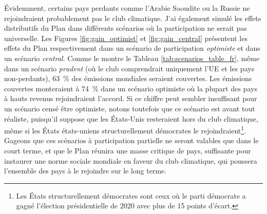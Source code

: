 \documentclass[a5paper,french,openany]{memoir}
\begin{document}
Évidemment, certains pays perdants comme l'Arabie Saoudite ou la Russie ne rejoindraient probablement pas le club climatique. J'ai également simulé les effets distributifs du Plan dans différents scénarios où la participation ne serait pas universelle. Les Figures \ref{fig:gain_optimist} et \ref{fig:gain_central} présentent les effets du Plan respectivement dans un scénario de participation \textit{optimiste} et dans un scénario \textit{central}. Comme le montre le Tableau \ref{tab:scenarios_table_fr}, même dans un scénario \textit{prudent} (où le club comprendrait uniquement l'UE et les pays non-perdants), 63~\% des émissions mondiales seraient couvertes. Les émissions couvertes monteraient à 74~\% dans un scénario optimiste où la plupart des pays à hauts revenus rejoindraient l'accord. Si ce chiffre peut sembler insuffisant pour un scénario censé être optimiste, notons toutefois que ce scénario est avant tout réaliste, puisqu'il suppose que les États-Unis resteraient hors du club climatique, même si les États états-uniens structurellement démocrates le rejoindraient\footnote{Les États structurellement démocrates sont ceux où le parti démocrate a gagné l'élection présidentielle de 2020 avec plus de 15 points d'écart.}. Gageons que ces scénarios à participation partielle ne seront valables que dans le court terme, et que le Plan réunira une masse critique de pays, suffisante pour instaurer une norme sociale mondiale en faveur du club climatique, qui poussera l'ensemble des pays à le rejoindre sur le long terme.
\end{document}
